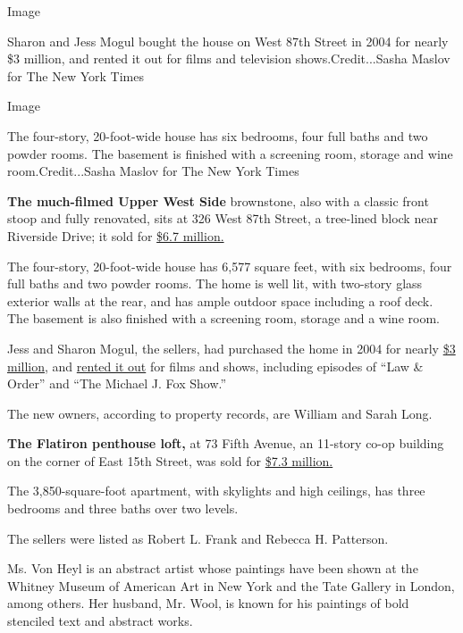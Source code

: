 Image

Sharon and Jess Mogul bought the house on West 87th Street in 2004 for
nearly \$3 million, and rented it out for films and television
shows.Credit...Sasha Maslov for The New York Times

Image

The four-story, 20-foot-wide house has six bedrooms, four full baths and
two powder rooms. The basement is finished with a screening room,
storage and wine room.Credit...Sasha Maslov for The New York Times

\textbf{The much-filmed Upper West Side} brownstone, also with a classic
front stoop and fully renovated, sits at 326 West 87th Street, a
tree-lined block near Riverside Drive; it sold for
\href{https://a836-acris.nyc.gov/DS/DocumentSearch/DocumentDetail?doc_id=2020070200851003}{\$6.7
million.}

The four-story, 20-foot-wide house has 6,577 square feet, with six
bedrooms, four full baths and two powder rooms. The home is well lit,
with two-story glass exterior walls at the rear, and has ample outdoor
space including a roof deck. The basement is also finished with a
screening room, storage and a wine room.

Jess and Sharon Mogul, the sellers, had purchased the home in 2004 for
nearly
\href{https://a836-acris.nyc.gov/DS/DocumentSearch/DocumentDetail?doc_id=2004012300522002}{\$3
million}, and
\href{https://www.nytimes.com/2016/03/13/realestate/movies-and-television-filmed-in-new-york-city.html}{rented
it out} for films and shows, including episodes of ``Law \& Order'' and
``The Michael J. Fox Show.''

The new owners, according to property records, are William and Sarah
Long.

\textbf{The Flatiron penthouse loft,} at 73 Fifth Avenue, an 11-story
co-op building on the corner of East 15th Street, was sold for
\href{https://a836-acris.nyc.gov/DS/DocumentSearch/DocumentDetail?doc_id=2020032000639001}{\$7.3
million.}

The 3,850-square-foot apartment, with skylights and high ceilings, has
three bedrooms and three baths over two levels.

The sellers were listed as Robert L. Frank and Rebecca H. Patterson.

Ms. Von Heyl is an abstract artist whose paintings have been shown at
the Whitney Museum of American Art in New York and the Tate Gallery in
London, among others. Her husband, Mr. Wool, is known for his paintings
of bold stenciled text and abstract works.

